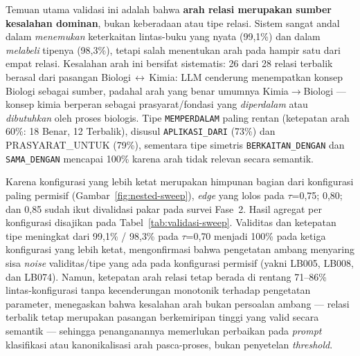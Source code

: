 \documentclass[main]{subfiles}
\begin{document}
Temuan utama validasi ini adalah bahwa \textbf{arah relasi merupakan
sumber kesalahan dominan}, bukan keberadaan atau tipe relasi. Sistem
sangat andal dalam \textit{menemukan} keterkaitan lintas-buku yang nyata
(99{,}1\%) dan dalam \textit{melabeli} tipenya (98{,}3\%), tetapi salah
menentukan arah pada hampir satu dari empat relasi. Kesalahan arah ini
bersifat sistematis: 26 dari 28 relasi terbalik berasal dari pasangan
Biologi\,$\leftrightarrow$\,Kimia: LLM cenderung menempatkan konsep
Biologi sebagai sumber, padahal arah yang benar umumnya
Kimia$\to$Biologi --- konsep kimia berperan sebagai prasyarat/fondasi
yang \textit{diperdalam} atau \textit{dibutuhkan} oleh proses biologis.
Tipe \texttt{MEMPERDALAM} paling rentan (ketepatan arah 60\%: 18 Benar, 12
Terbalik), disusul \texttt{APLIKASI\_DARI} (73\%) dan PRASYARAT\_UNTUK (79\%),
sementara tipe simetris \texttt{BERKAITAN\_DENGAN} dan \texttt{SAMA\_DENGAN} mencapai
100\% karena arah tidak relevan secara semantik.

Karena konfigurasi yang lebih ketat merupakan himpunan bagian dari
konfigurasi paling permisif (Gambar~\ref{fig:nested-sweep}), \textit{edge}
yang lolos pada $\tau$=0{,}75; 0{,}80; dan 0{,}85 sudah ikut
divalidasi pakar pada survei Fase~2. Hasil agregat per
konfigurasi disajikan pada Tabel~\ref{tab:validasi-sweep}.
Validitas dan ketepatan tipe meningkat dari 99{,}1\% / 98{,}3\%
pada $\tau$=0{,}70 menjadi 100\% pada ketiga konfigurasi yang lebih
ketat, mengonfirmasi bahwa pengetatan ambang menyaring sisa
\textit{noise} validitas/tipe yang ada pada konfigurasi permisif (yakni
LB005, LB008, dan LB074). Namun, ketepatan arah relasi tetap berada di
rentang 71--86\% lintas-konfigurasi tanpa kecenderungan monotonik
terhadap pengetatan parameter, menegaskan bahwa kesalahan arah bukan
persoalan ambang --- relasi terbalik tetap merupakan pasangan
berkemiripan tinggi yang valid secara semantik --- sehingga
penanganannya memerlukan perbaikan pada \textit{prompt} klasifikasi
atau kanonikalisasi arah pasca-proses, bukan penyetelan
\textit{threshold}.
\end{document}
